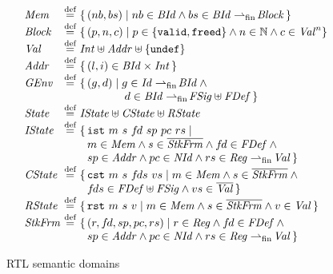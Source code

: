 
\begin{figure}
\[\begin{array}{@{}l@{~}c@{~}l@{}}
\rtlMem &\defeq& \setof{(nb,bs)\suchthat nb\in\rtlBId\land bs \in \rtlBId \fpfun \rtlBlock} \\
\rtlBlock &\defeq&
\setof{(p, n, c) \suchthat
  p \in \setofz{\rtlvalid,\rtlfreed} \land n \in \Nat \land c \in \rtlVal^n \!} \\
\rtlVal &\defeq& \rtlInt \uplus \rtlAddr \uplus \setofz{\rtlundef} \\
\rtlAddr &\defeq& \setof{(l,i) \in \rtlBId\times \rtlInt} \\
\rtlGEnv &\defeq& \setof{(g,d)\suchthat g\in \rtlId \fpfun \rtlBId {}\land{}\\
&&\qquad\quad~~~ d \in \rtlBId \fpfun \rtlFSig\uplus\rtlFunc}\\
\rtlState &\defeq& \rtlIState\uplus\rtlCState\uplus\rtlRState\\
\rtlIState&\defeq& \setof{\rtlist~m~s~\vfd~sp~pc~rs \suchthat\\
&&~~
m\in\rtlMem\land s\in\overline{\rtlStkFrm}
\land\vfd\in\rtlFunc\land{}\\
&&~~sp\in\rtlAddr \land pc\in\rtlNId\land
rs\in \rtlReg \fpfun \rtlVal
}
\\
\rtlCState&\defeq& \setof{\rtlcst~m~s~\vfds~vs\suchthat
m\in\rtlMem\land s\in\overline{\rtlStkFrm}{}\land{}\\
&&~~\vfds\in\rtlFunc\uplus\rtlFSig\land vs\in\overline{\rtlVal}
}
\\
\rtlRState&\defeq& \setof{\rtlrst~m~s~v \suchthat
m\in\rtlMem\land s\in\overline{\rtlStkFrm}\land
v\in \rtlVal
}
\\
\rtlStkFrm &\defeq& \setof{(r,\vfd,sp,pc,rs)\suchthat
r\in\rtlReg\land \vfd\in\rtlFunc\land{}\\
&&~~ sp\in\rtlAddr \land pc\in\rtlNId\land
rs\in \rtlReg \fpfun \rtlVal
}
\end{array}
\]
\caption{RTL semantic domains}
\label{fig:rtl-semdom}
\end{figure}

